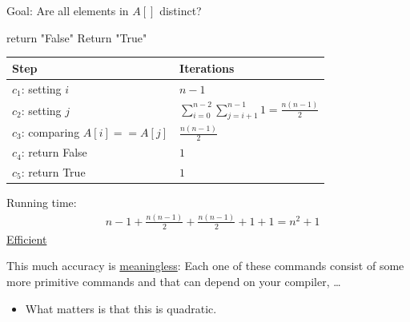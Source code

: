 \documentclass[11pt]{article}
\begin{document}
\begin{enumerate}
Goal: Are all elements in \(A[]\) distinct?
\begin{algorithmic}
			\State return "False"
		\EndIf
	   \EndFor
\EndFor
\State Return "True"
\end{algorithmic}
\begin{center}
\begin{tabular}{ll}
Step & Iterations\\
\hline
\(c_1\): setting \(i\) & \(n-1\)\\
\(c_2\): setting \(j\) & \(\sum_{i=0}^{n-2}\sum_{j=i+1}^{n-1}1=\frac{n(n-1)}{2}\)\\
\(c_3\): comparing \(A[i]==A[j]\) & \(\frac{n(n-1)}{2}\)\\
\(c_4\): return False & \(1\)\\
\(c_5\): return True & \(1\)\\
\end{tabular}
\end{center}

Running time: 
\begin{align*}
& n-1+\frac{n(n-1)}{2}+\frac{n(n-1)}{2}+1+1 = n^2+1
\end{align*}
\uline{Efficient}

This much accuracy is \uline{meaningless}: Each one of these commands consist of some more primitive commands and that can depend on your compiler, \ldots
\begin{itemize}
\item What matters is that this is quadratic.
\end{itemize}
\end{enumerate}
\end{document}
